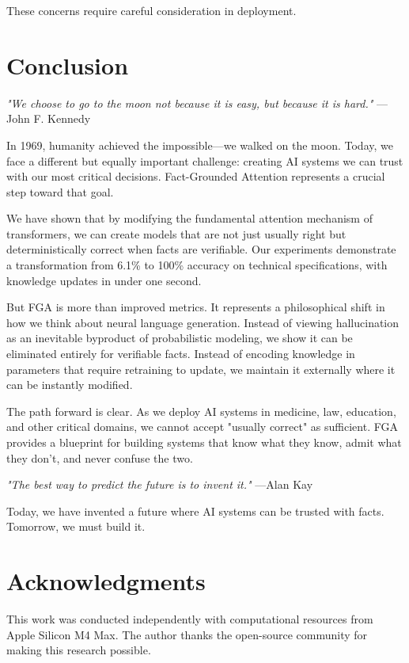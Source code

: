 \documentclass[11pt, a4paper]{article}
\theoremstyle{definition}
\begin{document}
These concerns require careful consideration in deployment.

\section{Conclusion}

\textit{"We choose to go to the moon not because it is easy, but because it is hard."} —John F. Kennedy

In 1969, humanity achieved the impossible—we walked on the moon. Today, we face a different but equally important challenge: creating AI systems we can trust with our most critical decisions. Fact-Grounded Attention represents a crucial step toward that goal.

We have shown that by modifying the fundamental attention mechanism of transformers, we can create models that are not just usually right but deterministically correct when facts are verifiable. Our experiments demonstrate a transformation from 6.1\% to 100\% accuracy on technical specifications, with knowledge updates in under one second.

But FGA is more than improved metrics. It represents a philosophical shift in how we think about neural language generation. Instead of viewing hallucination as an inevitable byproduct of probabilistic modeling, we show it can be eliminated entirely for verifiable facts. Instead of encoding knowledge in parameters that require retraining to update, we maintain it externally where it can be instantly modified.

The path forward is clear. As we deploy AI systems in medicine, law, education, and other critical domains, we cannot accept "usually correct" as sufficient. FGA provides a blueprint for building systems that know what they know, admit what they don't, and never confuse the two.

\textit{"The best way to predict the future is to invent it."} —Alan Kay

Today, we have invented a future where AI systems can be trusted with facts. Tomorrow, we must build it.

\section*{Acknowledgments}

This work was conducted independently with computational resources from Apple Silicon M4 Max. The author thanks the open-source community for making this research possible.
\end{document}

